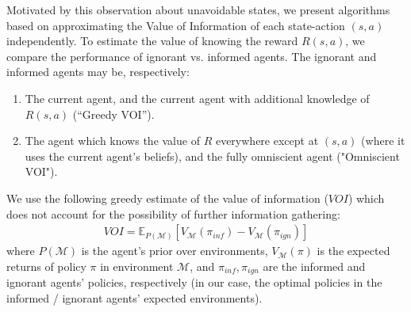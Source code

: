 \documentclass{article}
\newcommand{\M}{\mathcal{M}}
\begin{document}


Motivated by this observation about unavoidable states, we present algorithms based on approximating the Value of Information of each state-action $(s,a)$ independently. To estimate the value of knowing the reward $R(s,a)$, we compare the performance of ignorant vs. informed agents.  
The ignorant and informed agents may be, respectively:
\begin{enumerate}
\item The current agent, and the current agent with additional knowledge of $R(s,a)$ (``Greedy VOI'').
\item The agent which knows the value of $R$ everywhere except at $(s,a)$ (where it uses the current agent's beliefs), and the fully omniscient agent ("Omniscient VOI").
\end{enumerate}


We use the following greedy estimate of the value of information ($\mathit{VOI}$) which does not account for the possibility of further information gathering:
\begin{align}
\mathit{VOI} = \mathbb{E}_{P(\M)} [
    V_{\M} (\pi_{inf} )
  - V_{\M} (\pi_{ign} )
  ]
\end{align}
where $P(\M)$ is the agent's prior over environments, $V_{\M}(\pi)$ is the expected returns of policy $\pi$ in environment $\M$, and $\pi_{inf}, \pi_{ign}$ are the informed and ignorant agents' policies, respectively (in our case, the optimal policies in the informed / ignorant agents' expected environments).
\end{document}
